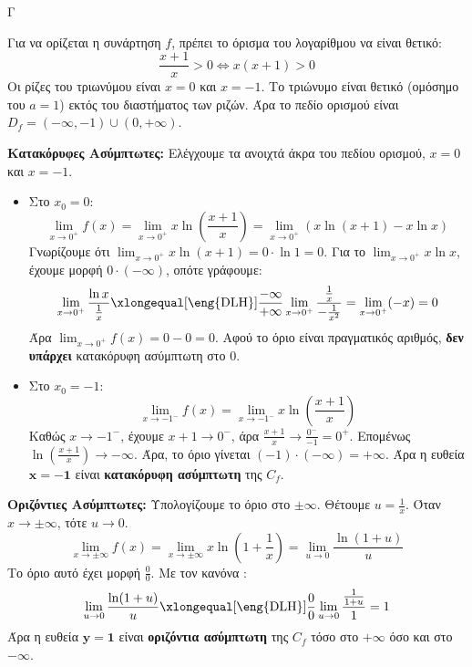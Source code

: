 \begin{thema}{Γ}
\begin{erwthma}
\item Για να ορίζεται η συνάρτηση $f$, πρέπει το όρισμα του λογαρίθμου να είναι θετικό:
\[ \frac{x+1}{x} > 0 \Leftrightarrow x(x+1) > 0 \]
Οι ρίζες του τριωνύμου είναι $x=0$ και $x=-1$. Το τριώνυμο είναι θετικό (ομόσημο του $a=1$) εκτός του διαστήματος των ριζών. 
Άρα το πεδίο ορισμού είναι $D_f = (-\infty, -1) \cup (0, +\infty)$.

\textbf{Κατακόρυφες Ασύμπτωτες:} Ελέγχουμε τα ανοιχτά άκρα του πεδίου ορισμού, $x=0$ και $x=-1$.
\begin{itemize}
    \item Στο $x_0 = 0$: 
    \[ \lim_{x \to 0^+} f(x) = \lim_{x \to 0^+} x \ln\left(\frac{x+1}{x}\right) = \lim_{x \to 0^+} \left( x \ln(x+1) - x \ln x \right) \]
    Γνωρίζουμε ότι $\lim_{x \to 0^+} x \ln(x+1) = 0 \cdot \ln 1 = 0$. 
    Για το $\lim_{x \to 0^+} x \ln x$, έχουμε μορφή $0 \cdot (-\infty)$, οπότε γράφουμε:
    \[ \lim_{x \to 0^+} \frac{\ln x}{\frac{1}{x}} \xlongequal[\text{\eng{DLH}}]{\frac{-\infty}{+\infty}} \lim_{x \to 0^+} \frac{\frac{1}{x}}{-\frac{1}{x^2}} = \lim_{x \to 0^+} (-x) = 0 \]
    Άρα $\lim_{x \to 0^+} f(x) = 0 - 0 = 0$. Αφού το όριο είναι πραγματικός αριθμός, \textbf{δεν υπάρχει} κατακόρυφη ασύμπτωτη στο $0$.
    \item Στο $x_0 = -1$:
    \[ \lim_{x \to -1^-} f(x) = \lim_{x \to -1^-} x \ln\left(\frac{x+1}{x}\right) \]
    Καθώς $x \to -1^-$, έχουμε $x+1 \to 0^-$, άρα $\frac{x+1}{x} \to \frac{0^-}{-1} = 0^+$. Επομένως $\ln\left(\frac{x+1}{x}\right) \to -\infty$.
    Άρα, το όριο γίνεται $(-1) \cdot (-\infty) = +\infty$. 
    Άρα η ευθεία $\boldsymbol{x = -1}$ είναι \textbf{κατακόρυφη ασύμπτωτη} της $C_f$.
\end{itemize}

\textbf{Οριζόντιες Ασύμπτωτες:}
Υπολογίζουμε το όριο στο $\pm\infty$. Θέτουμε $u = \frac{1}{x}$. Όταν $x \to \pm\infty$, τότε $u \to 0$.
\[ \lim_{x \to \pm\infty} f(x) = \lim_{x \to \pm\infty} x \ln\left(1 + \frac{1}{x}\right) = \lim_{u \to 0} \frac{\ln(1+u)}{u} \]
Το όριο αυτό έχει μορφή $\frac{0}{0}$. Με τον κανόνα :
\[ \lim_{u \to 0} \frac{\ln(1+u)}{u} \xlongequal[\text{\eng{DLH}}]{\frac{0}{0}} \lim_{u \to 0} \frac{\frac{1}{1+u}}{1} = 1 \]
Άρα η ευθεία $\boldsymbol{y = 1}$ είναι \textbf{οριζόντια ασύμπτωτη} της $C_f$ τόσο στο $+\infty$ όσο και στο $-\infty$.


\end{erwthma}
\end{thema}
